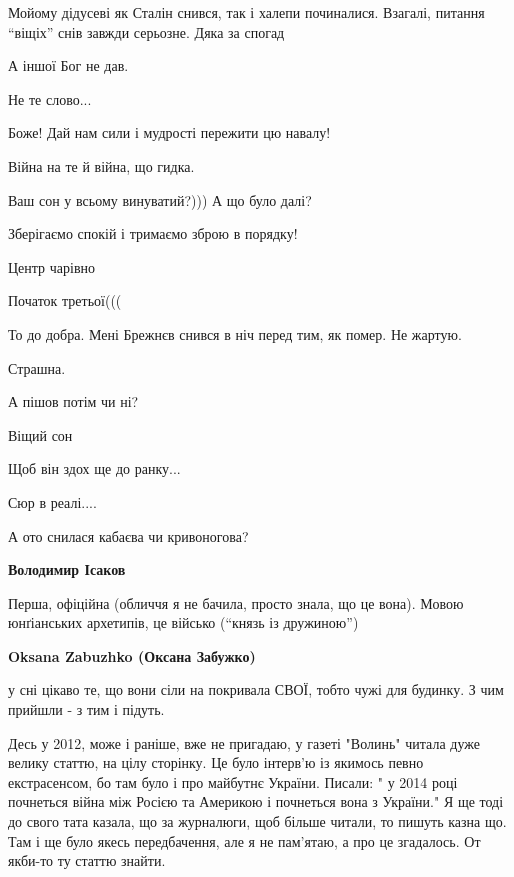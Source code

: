 \begin{itemize}

Мойому дідусеві як Сталін снився, так і халепи починалися. Взагалі, питання
\enquote{віщіх} снів завжди серьозне. Дяка за спогад


А іншої Бог не дав.

Не те слово...

Боже! Дай нам сили і мудрості пережити цю навалу!

Війна на те й війна, що гидка.

Ваш сон у всьому винуватий?)))
А що було далі?

Зберігаємо спокій і тримаємо зброю в порядку!

Центр чарівно

Початок третьої(((

То до добра. Мені Брежнєв снився в ніч перед тим, як помер. Не жартую.

Страшна.

А пішов потім чи ні?

Віщий сон

Щоб він здох ще до ранку...

Сюр в реалі....

А ото снилася кабаєва чи кривоногова?

\begin{itemize} %
\textbf{Володимир Ісаков} 

Перша, офіційна (обличчя я не бачила, просто знала, що це вона). Мовою
юнґіанських архетипів, це військо (\enquote{князь із дружиною})


\textbf{Oksana Zabuzhko (Оксана Забужко)} 

у сні цікаво те, що вони сіли на покривала СВОЇ, тобто чужі для будинку. З чим
прийшли - з тим і підуть.

\end{itemize} %


Десь у 2012, може і раніше, вже не пригадаю, у газеті "Волинь" читала дуже
велику статтю, на цілу сторінку. Це було інтерв'ю із якимось певно
екстрасенсом, бо там було і про майбутнє України. Писали: " у 2014 році
почнеться війна між Росією та Америкою і почнеться вона з України." Я ще тоді
до свого тата казала, що за журналюги, щоб більше читали, то пишуть казна що.
Там і ще було якесь передбачення, але я не пам'ятаю, а про це згадалось. От
якби-то ту статтю знайти.



\end{itemize}

